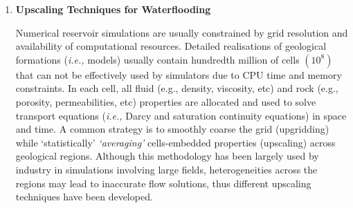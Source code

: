 \documentclass[12pts,a4paper,amsmath,amssymb,floatfix]{article}%
\newcommand{\all}{MSc O$\&$GE, PetE, UG Chem/Mech/Pet Engineering}
\newcommand{\ie}{{\it i.e., }}
\newcommand{\etall}{{\it et al. }}
\begin{document}
\begin{enumerate}[label=\bfseries Project: \arabic*:]
\noindent
{\bf Specifics:} 
\begin{enumerate}
\item \all -- 1 student;
\item Computational/Theoretical/Review;
\item After initial review of the whole workflow (Weeks 1-3), the student {\bf must} choose one/two stage(s) and undertake an in-depth analysis and simulation (in either programming language, \ie Matlab, Python, C or Fortran, or an appropriate simulation tool) on this/these stage(s);
\end{enumerate}

\noindent
{\bf References:}
\begin{itemize}
\item Chen (2007) `Reservoir Simulation – Mathematical Techniques in Oil Recovery’, SIAM;
\item Ahmed $\&$ McKinney (2005) `Advanced Reservoir Engineering’, Elsevier;
\item Jenny \etall (2002) `Modeling Flow in Geometrically Complex Reservoirs Using Hexahedral Multiblock Grids’, SPE 78673;
\item DeBaun \etall (2006) `An Extensible Architecture for Next Generation Scalable Parallel Reservoir Simulation’, SPE 93274;
\item Chen \etall (2006) `Computational Methods for Multiphase Flows in PorousMedia', SIAM Computational Science $\&$ Engineering, ISBN 0-89871-606-3;
\item Teletzke \etall (2010) `Enhanced Oil Recovery Pilot Testing Best Practices', SPE Journal SPE118055;
\item Miller \etall (1998) `Multiphase Flow and Transport Modeling in Heterogeneous Porous Media: Challenges and Approaches', Advances in Water Resources 21:77-120.
\end{itemize}

\clearpage

\item {\bf Upscaling Techniques for Waterflooding}

  Numerical reservoir simulations are usually constrained by grid resolution and availability of computational resources. Detailed realisations of geological formations (\ie models) usually contain hundredth million of cells $\left(\text{10}^{8}\right)$ that can not be effectively used by simulators due to CPU time and memory constraints.  In each cell, all fluid (e.g., density, viscosity, etc) and rock (e.g., porosity, permeabilities, etc) properties are allocated and used to solve transport equations (\ie Darcy and saturation continuity equations) in space and time. A common strategy is to smoothly coarse the grid (upgridding) while `statistically' {\it `averaging'} cells-embedded properties (upscaling) across geological regions.  Although this methodology has been largely used by industry in simulations involving large fields, heterogeneities across the regions may lead to inaccurate flow solutions, thus different upscaling techniques have been developed. 



\end{enumerate}
\end{document}
